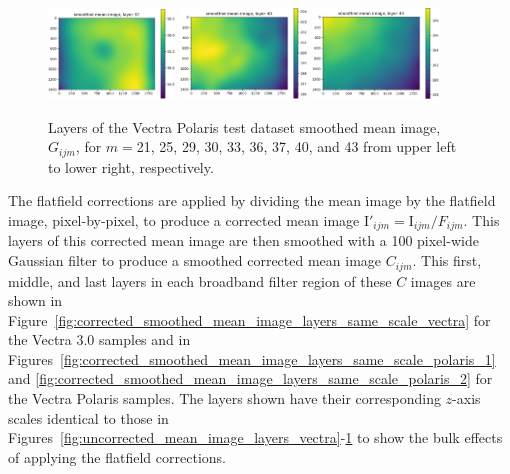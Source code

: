 \documentclass[letterpaper,11pt]{article}
\newcommand{\reffig}[1]{Figure~\ref{#1}}
\newcommand{\Iota}{\mathrm{I}}
\begin{document}
\begin{figure}[!hb]
\includegraphics[width=0.3\textwidth]{images/results/smoothed_mean_image_layers_polaris/smoothed_mean_image_layer_37}
\includegraphics[width=0.3\textwidth]{images/results/smoothed_mean_image_layers_polaris/smoothed_mean_image_layer_40}
\includegraphics[width=0.3\textwidth]{images/results/smoothed_mean_image_layers_polaris/smoothed_mean_image_layer_43}
\caption{\footnotesize Layers of the Vectra Polaris test dataset smoothed mean image, $G_{ijm}$, for $m=$21, 25, 29, 30, 33, 36, 37, 40, and 43 from upper left to lower right, respectively.}
\label{fig:uncorrected_mean_image_layers_polaris_2}
\end{figure}

The flatfield corrections are applied by dividing the mean image by the flatfield image, pixel-by-pixel, to produce a corrected mean image $\Iota'_{ijm}=\Iota_{ijm}/F_{ijm}$. This layers of this corrected mean image are then smoothed with a 100 pixel-wide Gaussian filter to produce a smoothed corrected mean image $C_{ijm}$. This first, middle, and last layers in each broadband filter region of these $C$ images are shown in \reffig{fig:corrected_smoothed_mean_image_layers_same_scale_vectra} for the Vectra 3.0 samples and in Figures~\ref{fig:corrected_smoothed_mean_image_layers_same_scale_polaris_1} and \ref{fig:corrected_smoothed_mean_image_layers_same_scale_polaris_2} for the Vectra Polaris samples. The layers shown have their corresponding $z$-axis scales identical to those in Figures~\ref{fig:uncorrected_mean_image_layers_vectra}-\ref{fig:uncorrected_mean_image_layers_polaris_2} to show the bulk effects of applying the flatfield corrections.
\end{document}
